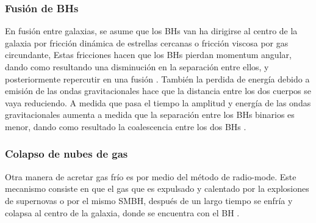     \subsubsection{Fusión de BHs}
    \label{subsubsec: mergers_BHs}
En fusión entre galaxias, se asume que los BHs van ha dirigirse al centro de la galaxia por fricción dinámica de estrellas cercanas o fricción viscosa por gas circundante, Estas fricciones hacen que los BHs pierdan momentum angular, dando como resultando una disminución en la separación entre ellos, y posteriormente repercutir en una fusión \cite{fanidakis2011}. También la perdida de energía debido a emisión de las ondas gravitacionales hace que la distancia entre los dos cuerpos se vaya reduciendo. A medida que pasa el tiempo 
la amplitud y energía de las ondas gravitacionales aumenta a medida que la separación entre los BHs binarios es menor,
dando como resultado la coalescencia entre los dos BHs \cite{fanidakis2011}. 

    \subsubsection{Colapso de nubes de gas}
    \label{subsubsec: colapso_nubes_gas}
Otra manera de acretar gas frío es por medio del método de radio-mode. Este mecanismo consiste en que el gas que es expulsado y calentado por la explosiones de supernovas o por el mismo SMBH, después de un largo tiempo se enfría y colapsa al centro de la galaxia, donde se encuentra con el BH \cite{fanidakis2011}.

